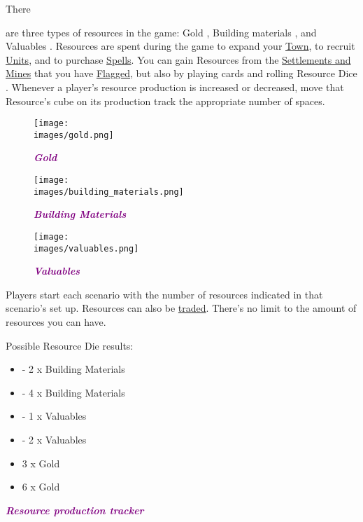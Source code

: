 \hypertarget{Resources}{There} are three types of resources in the game: Gold , Building materials , and Valuables .
Resources are spent during the game to expand your \hyperlink{Town}{Town}, to recruit \hyperlink{Units}{Units}, and to purchase \hyperlink{spells}{Spells}.
You can gain Resources from the \hyperlink{Mines}{Settlements and Mines} that you have \hyperlink{Categories}{Flagged}, but also by playing cards and rolling Resource Dice .
Whenever a player's resource production is increased or decreased, move that Resource's cube on its production track the appropriate number of spaces.\par
\begin{figure}[h]
  \centering
    \centering
    \texttt{[image: \\images/gold.png]}
    \caption{{\textit{\textbf{\textcolor{purple}{Gold}}}}}
  \endminipage
    \centering
    \texttt{[image: \\images/building\_materials.png]}
    \caption{{\textit{\textbf{{\textcolor{purple}{Building Materials}}}}}}
  \endminipage
    \centering
    \texttt{[image: \\images/valuables.png]}
    \caption{{\textit{\textbf{{\textcolor{purple}{Valuables}}}}}}
  \endminipage
\end{figure}
Players start each scenario with the number of resources indicated in that scenario’s set up.
Resources can also be \hyperlink{Trading}{traded}.
There's no limit to the amount of resources you can have.\bigbreak

\begin{minipage}[T]{0.38\textwidth}
    Possible Resource Die  results:\bigbreak
    \begin{itemize}
        \setlength\itemsep{10pt}
        \item  - 2 x Building Materials
        \item  - 4 x Building Materials
        \item  - 1 x Valuables
        \item  - 2 x Valuables
        \item  3 x Gold
        \item  6 x Gold
    \end{itemize}
\end{minipage}
\begin{minipage}[t]{0.48\textwidth}
    \break
    \centering
    \footnotesize{\textbf{\textit{\textcolor{purple}{Resource production tracker}}}}
\end{minipage}\hfill
